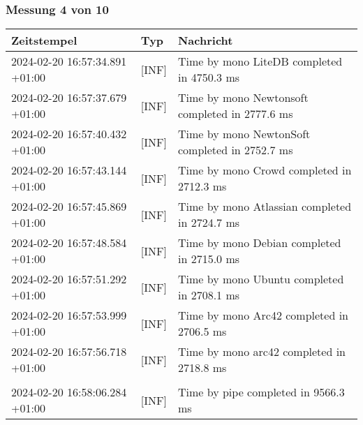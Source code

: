     \subsubsection{Messung 4 von 10} \label{subsubsec:LiteDbWenigerPaketeAlsDb4von10}
        {
            {\small
                \begin{tabularx}{\textwidth}{|l|l|X|}
                    \hline
                    \textbf{Zeitstempel} & \textbf{Typ} & \textbf{Nachricht} \\
                    \hline
                    \endhead
                    2024-02-20 16:57:34.891 +01:00 & [INF] & Time by mono LiteDB completed in 4750.3 ms \\
                    2024-02-20 16:57:37.679 +01:00 & [INF] & Time by mono Newtonsoft completed in 2777.6 ms \\
                    2024-02-20 16:57:40.432 +01:00 & [INF] & Time by mono NewtonSoft completed in 2752.7 ms \\
                    2024-02-20 16:57:43.144 +01:00 & [INF] & Time by mono Crowd completed in 2712.3 ms \\
                    2024-02-20 16:57:45.869 +01:00 & [INF] & Time by mono Atlassian completed in 2724.7 ms \\
                    2024-02-20 16:57:48.584 +01:00 & [INF] & Time by mono Debian completed in 2715.0 ms \\
                    2024-02-20 16:57:51.292 +01:00 & [INF] & Time by mono Ubuntu completed in 2708.1 ms \\
                    2024-02-20 16:57:53.999 +01:00 & [INF] & Time by mono Arc42 completed in 2706.5 ms \\
                    2024-02-20 16:57:56.718 +01:00 & [INF] & Time by mono arc42 completed in 2718.8 ms \\
                    & & \\
                    2024-02-20 16:58:06.284 +01:00 & [INF] & Time by pipe completed in 9566.3 ms \\
                    \hline
                \end{tabularx}
            }
        }

